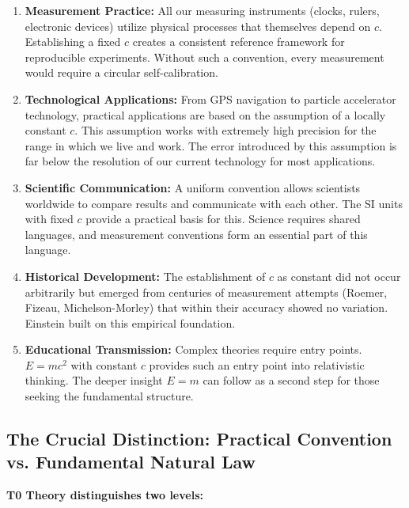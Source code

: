 	\begin{enumerate}[leftmargin=*, label=\textbf{\arabic*.}]
		\item \textbf{Measurement Practice:} All our measuring instruments (clocks, rulers, electronic devices) utilize physical processes that themselves depend on \( c \). Establishing a fixed \( c \) creates a consistent reference framework for reproducible experiments. Without such a convention, every measurement would require a circular self-calibration.
		
		\item \textbf{Technological Applications:} From GPS navigation to particle accelerator technology, practical applications are based on the assumption of a locally constant \( c \). This assumption works with extremely high precision for the range in which we live and work. The error introduced by this assumption is far below the resolution of our current technology for most applications.
		
		\item \textbf{Scientific Communication:} A uniform convention allows scientists worldwide to compare results and communicate with each other. The SI units with fixed \( c \) provide a practical basis for this. Science requires shared languages, and measurement conventions form an essential part of this language.
		
		\item \textbf{Historical Development:} The establishment of \( c \) as constant did not occur arbitrarily but emerged from centuries of measurement attempts (Roemer, Fizeau, Michelson-Morley) that within their accuracy showed no variation. Einstein built on this empirical foundation.
		
		\item \textbf{Educational Transmission:} Complex theories require entry points. \( E = mc^2 \) with constant \( c \) provides such an entry point into relativistic thinking. The deeper insight \( E = m \) can follow as a second step for those seeking the fundamental structure.
	\end{enumerate}
	
	\subsection{The Crucial Distinction: Practical Convention vs. Fundamental Natural Law}
	
	\textbf{T0 Theory distinguishes two levels:}
	
